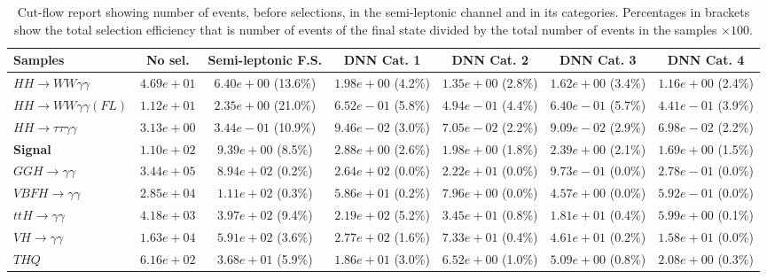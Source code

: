 \begin{landscape}
\begin{table}[h!]
    \centering
    \caption{Cut-flow report showing number of events, before selections, in the semi-leptonic channel and in its categories. Percentages in brackets show the total selection efficiency that is number of events of the final state divided by the total number of events in the samples $\times 100$.}
\begin{tabular}{ |l|c|c|c|c|c|c| }
    \hline
    Samples                                & No sel.                   & Semi-leptonic F.S.               & DNN Cat. 1           & DNN Cat. 2          & DNN Cat. 3            & DNN Cat. 4            \\
    \hline
           $HH \rightarrow WW\gamma\gamma$ &  $4.69e+01$ &  $6.40e+00$ (13.6\%) &  $1.98e+00$ (4.2\%) &  $1.35e+00$ (2.8\%) &    $1.62e+00$ (3.4\%) &    $1.16e+00$ (2.4\%) \\
      $HH \rightarrow WW\gamma\gamma (FL)$ &  $1.12e+01$ &  $2.35e+00$ (21.0\%) &  $6.52e-01$ (5.8\%) &  $4.94e-01$ (4.4\%) &    $6.40e-01$ (5.7\%) &    $4.41e-01$ (3.9\%) \\
     $HH \rightarrow \tau\tau\gamma\gamma$ &  $3.13e+00$ &  $3.44e-01$ (10.9\%) &  $9.46e-02$ (3.0\%) &  $7.05e-02$ (2.2\%) &    $9.09e-02$ (2.9\%) &    $6.98e-02$ (2.2\%) \\
                           \textbf{Signal} &  $1.10e+02$ &   $9.39e+00$ (8.5\%) &  $2.88e+00$ (2.6\%) &  $1.98e+00$ (1.8\%) &    $2.39e+00$ (2.1\%) &    $1.69e+00$ (1.5\%) \\
            $GGH \rightarrow \gamma\gamma$ &  $3.44e+05$ &   $8.94e+02$ (0.2\%) &  $2.64e+02$ (0.0\%) &  $2.22e+01$ (0.0\%) &    $9.73e-01$ (0.0\%) &    $2.78e-01$ (0.0\%) \\
           $VBFH \rightarrow \gamma\gamma$ &  $2.85e+04$ &   $1.11e+02$ (0.3\%) &  $5.86e+01$ (0.2\%) &  $7.96e+00$ (0.0\%) &    $4.57e+00$ (0.0\%) &    $5.92e-01$ (0.0\%) \\
            $ttH \rightarrow \gamma\gamma$ &  $4.18e+03$ &   $3.97e+02$ (9.4\%) &  $2.19e+02$ (5.2\%) &  $3.45e+01$ (0.8\%) &    $1.81e+01$ (0.4\%) &    $5.99e+00$ (0.1\%) \\
             $VH \rightarrow \gamma\gamma$ &  $1.63e+04$ &   $5.91e+02$ (3.6\%) &  $2.77e+02$ (1.6\%) &  $7.33e+01$ (0.4\%) &    $4.61e+01$ (0.2\%) &    $1.58e+01$ (0.0\%) \\
                                     $THQ$ &  $6.16e+02$ &   $3.68e+01$ (5.9\%) &  $1.86e+01$ (3.0\%) &  $6.52e+00$ (1.0\%) &    $5.09e+00$ (0.8\%) &    $2.08e+00$ (0.3\%) \\

\end{tabular}
\end{table}
\end{landscape}

